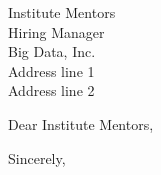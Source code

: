 \documentclass[10pt,letter]{letter}
\def\hm{Institute Mentors} %
\begin{document}
\begin{letter}{\hm \\ Hiring Manager \\ Big Data, Inc. \\ Address line 1 \\ Address line 2  }

\opening{Dear \hm,}

\setlength\parindent{.5in}



 

\closing{Sincerely,}
\end{letter}
\end{document}
